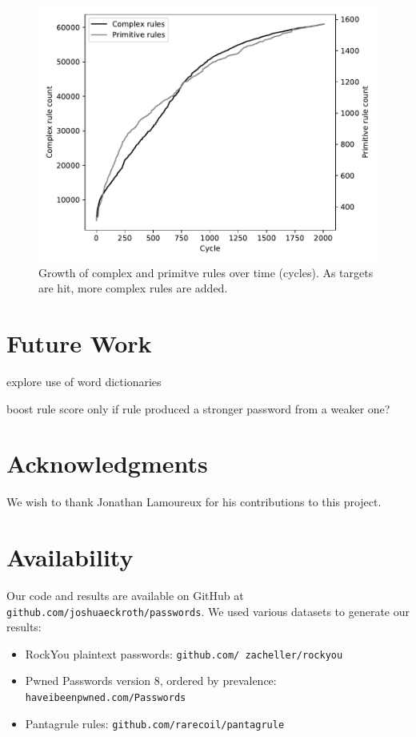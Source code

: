 \documentclass[letterpaper,twocolumn,10pt]{article}
\begin{document}
\begin{figure}
\includegraphics[width=\linewidth]
{analysis/passwords-analysis/stats-rules_composites_size.pdf}
\caption{Growth of complex and primitve rules over time (cycles). As targets
are hit, more complex rules are added. }
\label{fig:rule_count}
\end{figure}

\section{Future Work}

explore use of word dictionaries

boost rule score only if rule produced a stronger password from a weaker one?

\section*{Acknowledgments}

We wish to thank Jonathan Lamoureux for his contributions to this project.

\section*{Availability}

Our code and results are available on GitHub at
\texttt{github.com/joshuaeckroth/passwords}. We used various datasets
to generate our results:

\begin{itemize}
\item RockYou plaintext passwords:
\texttt{github.com/ zacheller/rockyou}
\item Pwned Passwords version 8, ordered by prevalence:
\texttt{haveibeenpwned.com/Passwords}
\item Pantagrule rules: \texttt{github.com/rarecoil/pantagrule}
\end{itemize}
\end{document}
